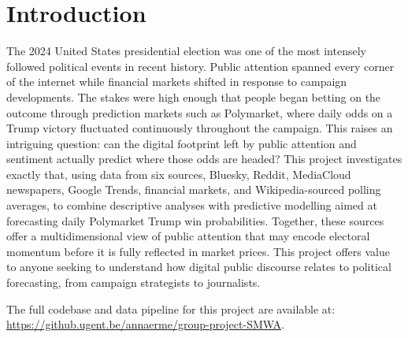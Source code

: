 \section{Introduction}

The 2024 United States presidential election was one of the most intensely followed political events in recent history. Public attention spanned every corner of the internet while financial markets shifted in response to campaign developments. The stakes were high enough that people began betting on the outcome through prediction markets such as Polymarket, where daily odds on a Trump victory fluctuated continuously throughout the campaign. This raises an intriguing question: can the digital footprint left by public attention and sentiment actually predict where those odds are headed?
This project investigates exactly that, using data from six sources, Bluesky, Reddit, MediaCloud newspapers, Google Trends, financial markets, and Wikipedia-sourced polling averages, to combine descriptive analyses with predictive modelling aimed at forecasting daily Polymarket Trump win probabilities. Together, these sources offer a multidimensional view of public attention that may encode electoral momentum before it is fully reflected in market prices.
This project offers value to anyone seeking to understand how digital public discourse relates to political forecasting, from campaign strategists to journalists.

The full codebase and data pipeline for this project are available at: \url{https://github.ugent.be/annaerme/group-project-SMWA}.
